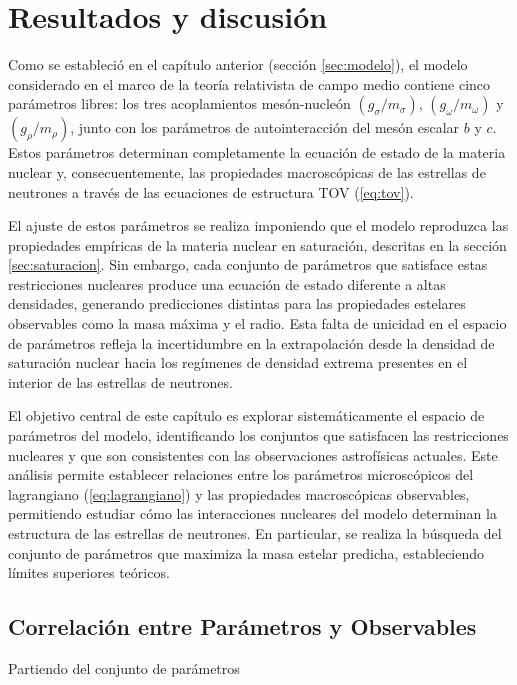 \chapter{Resultados y discusión}
\thispagestyle{fancy}

Como se estableció en el capítulo anterior (sección \ref{sec:modelo}), el modelo considerado en el marco de la teoría relativista de campo medio contiene cinco parámetros libres: los tres acoplamientos mesón-nucleón $(g_\sigma/m_\sigma)$, $(g_\omega/m_\omega)$ y $(g_\rho/m_\rho)$, junto con los parámetros de autointeracción del mesón escalar $b$ y $c$. Estos parámetros determinan completamente la ecuación de estado de la materia nuclear y, consecuentemente, las propiedades macroscópicas de las estrellas de neutrones a través de las ecuaciones de estructura TOV (\ref{eq:tov}).

El ajuste de estos parámetros se realiza imponiendo que el modelo reproduzca las propiedades empíricas de la materia nuclear en saturación, descritas en la sección \ref{sec:saturacion}. Sin embargo, cada conjunto de parámetros que satisface estas restricciones nucleares produce una ecuación de estado diferente a altas densidades, generando predicciones distintas para las propiedades estelares observables como la masa máxima y el radio. Esta falta de unicidad en el espacio de parámetros refleja la incertidumbre en la extrapolación desde la densidad de saturación nuclear hacia los regímenes de densidad extrema presentes en el interior de las estrellas de neutrones.

El objetivo central de este capítulo es explorar sistemáticamente el espacio de parámetros del modelo, identificando los conjuntos que satisfacen las restricciones nucleares y que son consistentes con las observaciones astrofísicas actuales. Este análisis permite establecer relaciones entre los parámetros microscópicos del lagrangiano (\ref{eq:lagrangiano}) y las propiedades macroscópicas observables, permitiendo estudiar cómo las interacciones nucleares del modelo determinan la estructura de las estrellas de neutrones. En particular, se realiza la búsqueda del conjunto de parámetros que maximiza la masa estelar predicha, estableciendo límites superiores teóricos.

\clearpage
\section{Correlación entre Parámetros y Observables}

Partiendo del conjunto de parámetros \cite{glendenningCompactStarsNuclear2000}

